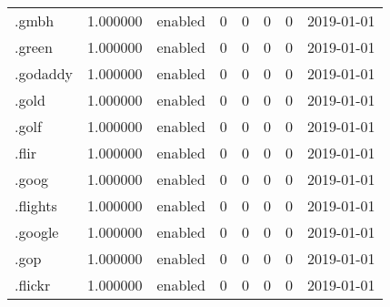 \begin{tabular}{lrlrrrrl}
.gmbh                     &          1.000000 &         enabled &                           0 &                           0 &                           0 &                   0 &           2019-01-01 \\
.green                    &          1.000000 &         enabled &                           0 &                           0 &                           0 &                   0 &           2019-01-01 \\
.godaddy                  &          1.000000 &         enabled &                           0 &                           0 &                           0 &                   0 &           2019-01-01 \\
.gold                     &          1.000000 &         enabled &                           0 &                           0 &                           0 &                   0 &           2019-01-01 \\
.golf                     &          1.000000 &         enabled &                           0 &                           0 &                           0 &                   0 &           2019-01-01 \\
.flir                     &          1.000000 &         enabled &                           0 &                           0 &                           0 &                   0 &           2019-01-01 \\
.goog                     &          1.000000 &         enabled &                           0 &                           0 &                           0 &                   0 &           2019-01-01 \\
.flights                  &          1.000000 &         enabled &                           0 &                           0 &                           0 &                   0 &           2019-01-01 \\
.google                   &          1.000000 &         enabled &                           0 &                           0 &                           0 &                   0 &           2019-01-01 \\
.gop                      &          1.000000 &         enabled &                           0 &                           0 &                           0 &                   0 &           2019-01-01 \\
.flickr                   &          1.000000 &         enabled &                           0 &                           0 &                           0 &                   0 &           2019-01-01 \\

\end{tabular}
